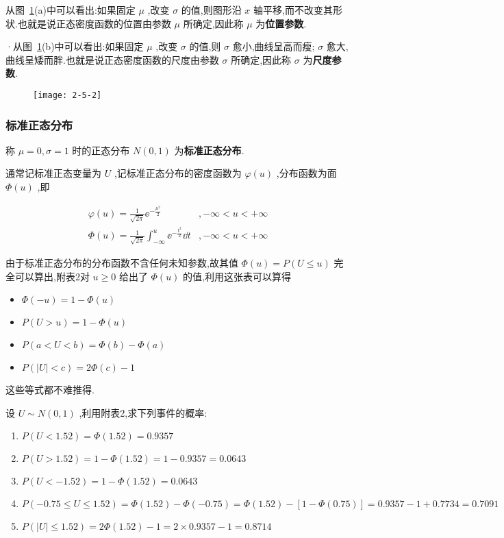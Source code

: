 从图~\ref{fig:2.5.2}(a)中可以看出:如果固定 $ \mu $ ,改变 $ \sigma $ 的值,则图形沿 $ x $ 轴平移,而不改变其形状.也就是说正态密度函数的位置由参数 $ \mu $ 所确定,因此称 $ \mu $ 为\textbf{位置参数}.

·从图~\ref{fig:2.5.2}(b)中可以看出:如果固定 $ \mu $ ,改变 $ \sigma $ 的值,则 $ \sigma $ 愈小,曲线呈高而瘦; $ \sigma $ 愈大,曲线呈矮而胖.也就是说正态密度函数的尺度由参数 $ \sigma $ 所确定,因此称 $ \sigma $ 为\textbf{尺度参数}.

\begin{figure}
	\centering
	\texttt{[image: 2-5-2]}
	\caption{}
	\label{fig:2.5.2}
\end{figure}

\subsubsection{标准正态分布}

称 $ \mu=0, \sigma=1 $ 时的正态分布 $ N(0,1) $ 为\textbf{标准正态分布}.

通常记标准正态变量为 $ U $ ,记标准正态分布的密度函数为 $ \varphi(u) $ ,分布函数为面 $ \Phi(u) $ ,即

\[
\begin{array}{ll}
{\varphi(u)=\frac{1}{\sqrt{2 \pi}} \ee ^{-\frac{\mu^{2}}{2}}} & {,-\infty<u<+\infty} \\ 
{\Phi(u)=\frac{1}{\sqrt{2 \pi}} \int_{-\infty}^{u} \ee ^{-\frac{t^{2}}{2}} \dd t} & {,-\infty<u<+\infty}
\end{array}
\]

由于标准正态分布的分布函数不含任何未知参数,故其值 $ \Phi(u)=P(U \leqslant u ) $ 完全可以算出,附表2对 $ u \geqslant 0 $ 给出了 $ \Phi(u) $ 的值,利用这张表可以算得
\begin{itemize}
	\item $ \Phi(-u)=1-\Phi(u) $ 
	\item $ P(U>u)=1-\Phi(u) $ 
	\item $ P(a<U<b)=\Phi(b)-\Phi(a) $ 
	\item $ P(|U|<c)=2 \Phi(c)-1 $ 
\end{itemize}

这些等式都不难推得.

\begin{example}\label{exam:2.5.1}
	设 $ U \sim N(0,1) $ ,利用附表2,求下列事件的概率:
	
	\begin{enumerate}
		\item $ P(U<1.52)=\Phi(1.52)=0.9357 $ 
		\item $ P(U>1.52)=1-\Phi(1.52)=1-0.9357=0.0643 $ 
		\item $ P(U<-1.52)=1-\Phi(1.52)=0.0643 $ 
		\item $ P(-0.75 \leqslant U \leqslant 1.52)=\Phi(1.52)-\Phi(-0.75)=\Phi(1.52)-[1- \Phi(0.75) ]=0.9357-1+0.7734=0.7091 $ 
		\item $ P(|U| \leqslant 1.52)=2 \Phi(1.52)-1=2 \times 0.9357-1=0.8714 $ 
	\end{enumerate}
\end{example}

